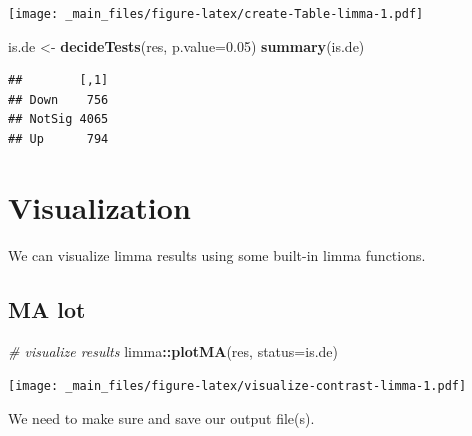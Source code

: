 \documentclass[
]{book}
\newenvironment{Shaded}{\begin{snugshade}}{\end{snugshade}}
\newcommand{\AttributeTok}[1]{\textcolor[rgb]{0.13,0.29,0.53}{#1}}
\newcommand{\CommentTok}[1]{\textcolor[rgb]{0.56,0.35,0.01}{\textit{#1}}}
\newcommand{\FloatTok}[1]{\textcolor[rgb]{0.00,0.00,0.81}{#1}}
\newcommand{\FunctionTok}[1]{\textcolor[rgb]{0.13,0.29,0.53}{\textbf{#1}}}
\newcommand{\NormalTok}[1]{#1}
\newcommand{\OtherTok}[1]{\textcolor[rgb]{0.56,0.35,0.01}{#1}}
\newcommand{\SpecialCharTok}[1]{\textcolor[rgb]{0.81,0.36,0.00}{\textbf{#1}}}
\begin{document}
\texttt{[image: \_main\_files/figure-latex/create-Table-limma-1.pdf]}

\begin{Shaded}
\begin{Highlighting}[]
\NormalTok{is.de }\OtherTok{\textless{}{-}} \FunctionTok{decideTests}\NormalTok{(res, }\AttributeTok{p.value=}\FloatTok{0.05}\NormalTok{)}
\FunctionTok{summary}\NormalTok{(is.de)}
\end{Highlighting}
\end{Shaded}

\begin{verbatim}
##        [,1]
## Down    756
## NotSig 4065
## Up      794
\end{verbatim}

\hypertarget{visualization}{%
\section{Visualization}\label{visualization}}

We can visualize limma results using some built-in limma functions.

\hypertarget{ma-lot}{%
\subsection{MA lot}\label{ma-lot}}

\begin{Shaded}
\begin{Highlighting}[]
\CommentTok{\# visualize results}
\NormalTok{limma}\SpecialCharTok{::}\FunctionTok{plotMA}\NormalTok{(res, }\AttributeTok{status=}\NormalTok{is.de)}
\end{Highlighting}
\end{Shaded}

\texttt{[image: \_main\_files/figure-latex/visualize-contrast-limma-1.pdf]}

We need to make sure and save our output file(s).
\end{document}
